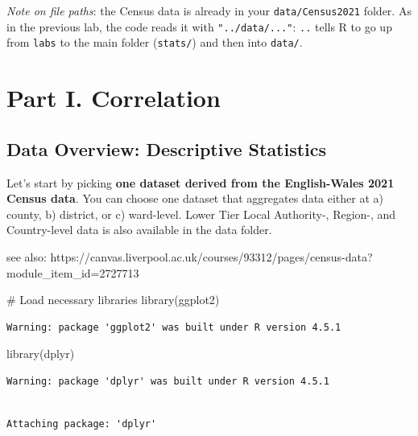 \documentclass[
  letterpaper,
  DIV=11,
  numbers=noendperiod]{scrreprt}
\newenvironment{Shaded}{\begin{snugshade}}{\end{snugshade}}
\newcommand{\CommentTok}[1]{\textcolor[rgb]{0.37,0.37,0.37}{#1}}
\newcommand{\FunctionTok}[1]{\textcolor[rgb]{0.28,0.35,0.67}{#1}}
\newcommand{\NormalTok}[1]{\textcolor[rgb]{0.00,0.23,0.31}{#1}}
\begin{document}
\emph{Note on file paths}: the Census data is already in your
\texttt{data/Census2021} folder. As in the previous lab, the code reads
it with \texttt{"../data/..."}: \texttt{..} tells R to go up from
\texttt{labs} to the main folder (\texttt{stats/}) and then into
\texttt{data/}.

\section{Part I. Correlation}\label{part-i.-correlation}

\subsection{Data Overview: Descriptive
Statistics}\label{data-overview-descriptive-statistics}

Let's start by picking \textbf{one dataset derived from the
English-Wales 2021 Census data}. You can choose one dataset that
aggregates data either at a) county, b) district, or c) ward-level.
Lower Tier Local Authority-, Region-, and Country-level data is also
available in the data folder.

see also:
https://canvas.liverpool.ac.uk/courses/93312/pages/census-data?module\_item\_id=2727713

\begin{Shaded}
\begin{Highlighting}[]
\CommentTok{\# Load necessary libraries }
\FunctionTok{library}\NormalTok{(ggplot2) }
\end{Highlighting}
\end{Shaded}

\begin{verbatim}
Warning: package 'ggplot2' was built under R version 4.5.1
\end{verbatim}

\begin{Shaded}
\begin{Highlighting}[]
\FunctionTok{library}\NormalTok{(dplyr) }
\end{Highlighting}
\end{Shaded}

\begin{verbatim}
Warning: package 'dplyr' was built under R version 4.5.1
\end{verbatim}

\begin{verbatim}

Attaching package: 'dplyr'
\end{verbatim}
\end{document}
